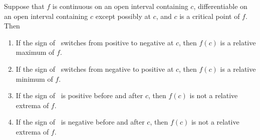 \begin{theorem}\label{thm:first_der}
Suppose that $f$ is continuous on an open interval containing $c$, differentiable on an open interval containing $c$ except possibly at $c$, and $c$ is a critical point of $f$. Then
\begin{enumerate}
\item	If the sign of \fp\ switches from positive to negative at $c$, then $f(c)$ is a relative maximum of $f$.
\item	If the sign of \fp\ switches from negative to positive at $c$, then $f(c)$ is a relative minimum of $f$.
\item	If the sign of \fp\ is positive before and after $c$, then $f(c)$ is not a relative extrema of $f$.
\item	If the sign of \fp\ is negative before and after $c$, then $f(c)$ is not a relative extrema of $f$.
\end{enumerate}
\end{theorem}

